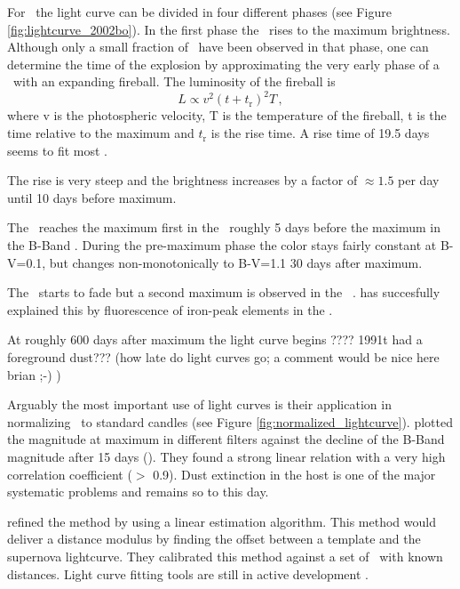 For \sneia\ the light curve can be divided in four different phases (see Figure \ref{fig:lightcurve_2002bo}). In the first phase the \sneia\  rises to the maximum brightness. Although only a small fraction of \sneia\ have been observed in that phase, one can determine the time of the explosion by approximating the very early phase of a \sneia\ with an expanding fireball. The luminosity of the fireball is 
\[L\propto v^2 (t+t_\textrm{r})^2 T\,,\]
where v is the photospheric velocity, T is the temperature of the fireball, t is the time relative to the maximum and $t_\textrm{r}$ is the rise time. A rise time of 19.5 days \citep{1999AJ....118.2675R} seems to fit most \sneia. 

The rise is very steep and the brightness increases by a factor of $\approx 1.5$ per day until 10 days before maximum. 

The \snia\ reaches the maximum first in the \nir\ roughly 5 days before the maximum in the B-Band \citep{2000MNRAS.314..782M}. 
During the pre-maximum phase the color stays fairly constant at B-V=0.1, but changes non-monotonically to B-V=1.1 30 days after maximum. 

The \snia\ starts to fade but  a second maximum is observed in the \nir\ \citep{2008ApJ...689..377W}.  \citet{2006ApJ...649..939K} has succesfully explained this by fluorescence of iron-peak elements in the \nir. 

At roughly 600 days after maximum the light curve begins ???? 1991t had a foreground dust??? (how late do light curves go; a comment would be nice here brian ;-) ) 

Arguably the most important use of light curves is their application in normalizing \sneia\ to standard candles (see Figure \ref{fig:normalized_lightcurve}). \citet[][]{1993ApJ...413L.105P} plotted the magnitude at maximum in different filters against the decline of the B-Band magnitude after 15 days (\dmb).  They found a strong linear relation with a very high correlation coefficient ($>$ 0.9). Dust extinction in the host is one of the major systematic problems and remains so to this day. 

\cite{1995ApJ...438L..17R} refined the method by using a linear estimation algorithm. This method would deliver a distance modulus by finding the offset between a template and the supernova lightcurve. They calibrated this method against a set of \sneia\ with known distances. 
Light curve fitting tools are still in active development \cite[e.g.][]{2007ApJ...659..122J, 2007A&A...466...11G}.

